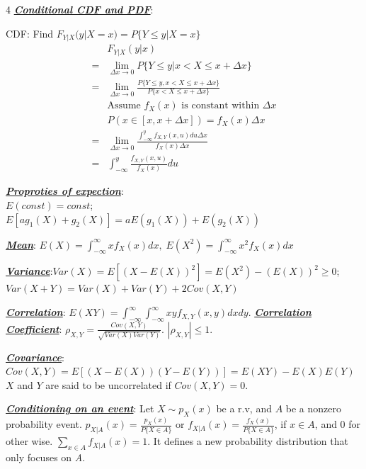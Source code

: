 \documentclass[12pt]{article}
\newcommand{\bulletPoint}[1]{\ul{\textit{\textbf{#1}}}}
\begin{document}
\begin{multicols*}{4}
\bulletPoint{Conditional CDF and PDF}:

CDF: Find $F_{Y|X}(y | X=x) = P\{ Y\leq y | X=x\}$
\useshortskip \begin{equation*}
    \begin{split}
        & F_{Y|X}(y|x) \\
        = & \lim_{\Delta x \rightarrow 0}P\{ Y \leq y | x < X \leq x+\Delta x \} \\
        = & \lim_{\Delta x \rightarrow 0} \frac{P\{ Y \leq y , x < X \leq x+\Delta x \}}{P\{ x < X \leq x+\Delta x \}}\\
        & \text{Assume $f_X(x)$ is constant within $\Delta x$}\\
        & P(x \in [x, x+\Delta x]) = f_X(x) \Delta x\\
        = & \lim_{\Delta x \rightarrow 0} \frac{\int^y_{- \infty} f_{X,Y}(x,u)du \Delta x}{f_X(x)\Delta x}\\
        = & \int^y_{- \infty} \frac{f_{X,Y}(x,u)}{f_X(x)} du
    \end{split}     
\end{equation*}


\bulletPoint{Proproties of expection}:\\
$E(const) = const$; \\
$E[ag_1(X) + g_2(X)] = a E(g_1(X)) + E(g_2(X))$


\bulletPoint{Mean}:
$E(X) = \int^{\infty}_{-\infty}xf_X(x)dx, \; E(X^2) = \int^{\infty}_{-\infty}x^2f_X(x)dx$


\bulletPoint{Variance}:$Var(X) = E[(X - E(X))^2] = E(X^2) - (E(X))^2 \geq 0$; $Var(X+Y) = Var(X) + Var(Y) + 2Cov(X,Y)$




\bulletPoint{Correlation}: $E(XY) = \int^\infty_{-\infty}\int^\infty_{-\infty}xyf_{X,Y}(x,y)dxdy$.
\bulletPoint{Correlation Coefficient}: $\rho_{X,Y} = \frac{Cov(X,Y)}{\sqrt{Var(X)Var(Y)}}$. $|\rho_{X,Y}| \leq 1$.


\bulletPoint{Covariance}: $Cov(X, Y) = E[(X - E(X))(Y - E(Y))] = E(XY) - E(X)E(Y)$ $X$ and $Y$ are said to be uncorrelated if $Cov(X,Y)=0$. 


\bulletPoint{Conditioning on an event}: Let $X \sim p_X(x)$ be a r.v, and $A$ be a nonzero probability event. $p_{X|A}(x) = \frac{p_X(x)}{P\{ X \in A\}}$ or $f_{X|A}(x) = \frac{f_X(x)}{P\{ X \in A\}}$,  if $x \in A$, and 0 for other wise. $\sum_{x \in A}f_{X|A}(x)=1$. It defines a new probability distribution that only focuses on \textit{A}. 



\end{multicols*}
\end{document}
